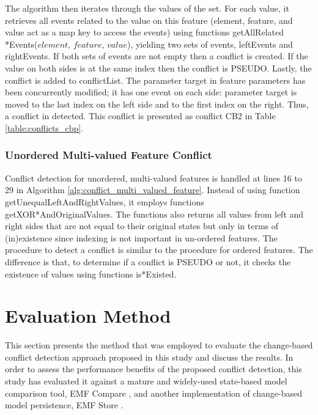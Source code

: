 The algorithm then iterates through the values of the set. For each value, it retrieves all events related to the value on this feature (element, feature, and value act as a map key to access the events) using functions \textsf{getAllRelated *Events($element$, $feature$, $value$)}, yielding two sets of events, \textsf{leftEvents} and \textsf{rightEvents}. If both sets of events are not empty then a conflict is created. If the value on both sides is at the same index then the conflict is \textsf{PSEUDO}. Lastly, the conflict is added to \textsf{conflictList}. The parameter \textsf{target} in feature \textsf{parameters} has been concurrently modified; it has one event on each side: parameter \textsf{target} is moved to the last index on the left side and to the first index on the right. Thus, a conflict in detected. This conflict is presented as conflict \textsf{CB2} in Table \ref{table:conflicts_cbp}.


\subsubsection{Unordered Multi-valued Feature Conflict} 
\label{sec:unordered_conflict}
Conflict detection for unordered, multi-valued features is handled at lines 16 to 29 in Algorithm \ref{alg:conflict_multi_valued_feature}. Instead of using function \textsf{getUnequalLeftAndRightValues}, it employs functions \textsf{getXOR*AndOriginalValues}. The functions also returns all values from left and right sides that are not equal to their original states but only in terms of (in)existence since indexing is not important in un-ordered features. The procedure to detect a conflict is similar to the procedure for ordered features. The difference is that, to determine if a conflict is \textsf{PSEUDO} or not, it checks the existence of values using functions \textsf{is*Existed}.


\section{Evaluation Method}
\label{sec:evaluation_method}
This section presents the method that was employed to evaluate the change-based conflict detection approach proposed in this study and discuss the results. In order to assess the performance benefits of the proposed conflict detection, this study has evaluated it against a mature and widely-used state-based model comparison tool, EMF Compare \cite{emfcompare2018developer,eclipse2017compare}, and another implementation of change-based model persistence, EMF Store \cite{koegel2010emfstore}.

